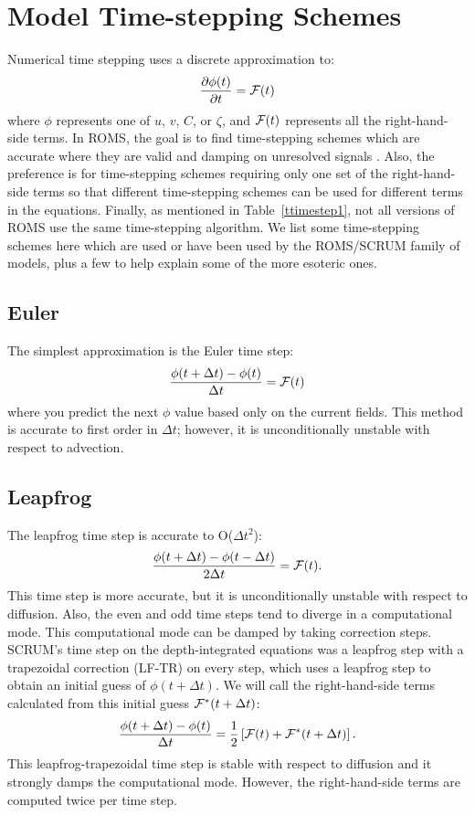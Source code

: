 \section {Model Time-stepping Schemes}
\label{Frog}
Numerical time stepping uses a discrete approximation to:
\begin{equation}
  \frac{\partial \phi(t)}{\partial t} = {\cal F}(t)
  \label{eq_rhs1}
\end{equation}
where $\phi$ represents one of $u$, $v$, $C$, or $\zeta$,
and ${\cal F}(t)$
represents all the right-hand-side terms.
In ROMS, the goal is to find time-stepping schemes which are accurate
where they are valid and damping on unresolved signals
\citep{SS2008b}. Also, the preference is for time-stepping schemes
requiring only one set of the right-hand-side terms so that different
time-stepping schemes can be used for different terms in the equations.
Finally, as mentioned in Table~\ref{ttimestep1}, not all versions of
ROMS use the same time-stepping algorithm. We list some
time-stepping schemes here which are used or have been used by the
ROMS/SCRUM family of models, plus a few to help explain some of the
more esoteric ones.

\subsection{Euler}
The simplest approximation is the Euler time step:
\begin{equation}
  \frac{\phi(t + \Delta t) - \phi(t)}{\Delta t} = {\cal F}(t)
\end{equation}
where you predict the next $\phi$ value based only on the current
fields.  This method is accurate to first order in $\Delta t$; however,
it is unconditionally unstable with respect to advection.

\subsection{Leapfrog}
The leapfrog time step is accurate to O($\Delta t^2$):
\begin{equation}
  \frac{\phi(t + \Delta t) - \phi(t - \Delta t)}{2\Delta t} =
  {\cal F}(t).
\end{equation}
This time step is more accurate, but it is unconditionally unstable
with respect to diffusion.  Also,
the even and odd time steps tend to diverge in a computational mode.
This computational mode can be damped by taking
correction steps.  SCRUM's time step on the depth-integrated
equations was a leapfrog step with a trapezoidal correction (LF-TR)
on every step, which uses a leapfrog step to obtain an initial guess of
$\phi(t+\Delta t)$.  We will call the right-hand-side terms calculated
from this initial guess ${\cal F}^*(t+\Delta t)$:
\begin{equation}
  \frac{\phi(t + \Delta t) - \phi(t)}{\Delta t} = \frac{1}{2}
  \left[ {\cal F}(t) + {\cal F}^*(t+\Delta t) \right] .
\end{equation}
This leapfrog-trapezoidal time step is stable with respect to diffusion
and it strongly damps the computational mode.  However, the
right-hand-side terms are computed twice per time step.

